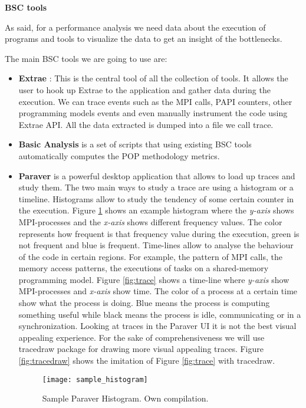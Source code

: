 \textbf{BSC tools}

As said, for a performance analysis we need data about the execution of programs and tools to visualize the data to get an insight of the bottlenecks.

The main BSC tools we are going to use are:

\begin{itemize}
  \item \textbf{Extrae} \cite{extraeTools}: This is the central tool of all the collection of tools. It allows the user to hook up Extrae to the application and gather data during the execution. We can trace events such as the MPI calls, PAPI \cite{papi}  counters, other programming models events and even manually instrument the code using Extrae API. All the data extracted is dumped into a file we call trace.
  \item \textbf{Basic Analysis} is a set of scripts that using existing BSC tools automatically computes the POP methodology metrics.
  \item \textbf{Paraver} \cite{paraverPaper} \cite{paraverWeb} is a powerful desktop application that allows to load up traces and study them. The two main ways to study a trace are using a histogram or a timeline. Histograms allow to study the tendency of some certain counter in the execution. Figure \ref{fig:hist} shows an example histogram where the \textit{y-axis} shows MPI-processes and the \textit{x-axis} shows different frequency values. The color represents how frequent is that frequency value during the execution, green is not frequent and blue is frequent. Time-lines allow to analyse the behaviour of the code in certain regions. For example, the pattern of MPI calls, the memory access patterns, the executions of tasks on a shared-memory programming model. Figure \ref{fig:trace} shows a time-line where \textit{y-axis} show MPI-processes and \textit{x-axis} show time. The color of a process at a certain time show what the process is doing. Blue means the process is computing something useful while black means the process is idle, communicating or in a synchronization. Looking at traces in the Paraver UI it is not the best visual appealing experience. For the sake of comprehensiveness we will use tracedraw \cite{tracedraw} package for drawing more visual appealing traces. Figure \ref{fig:tracedraw} shows the imitation of Figure \ref{fig:trace} with tracedraw.

    \begin{figure}[htbp]
      \centering
      \texttt{[image: sample\_histogram]}
      \caption[Sample Paraver Histogram]{Sample Paraver Histogram. Own compilation.}
      \label{fig:hist}
    \end{figure}


\end{itemize}

